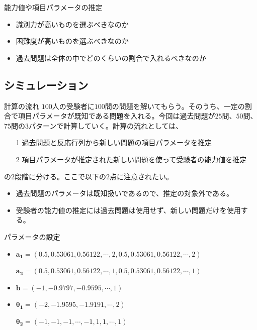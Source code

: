 \documentclass[aspectratio=169, dvipdfmx, 12pt]{beamer}
\begin{document}
\begin{frame}
  \begin{block}{能力値や項目パラメータの推定}
    \begin{itemize}
      \item 識別力が高いものを選ぶべきなのか
      \item 困難度が高いものを選ぶべきなのか
      \item 過去問題は全体の中でどのくらいの割合で入れるべきなのか
    \end{itemize}
  \end{block}
\end{frame}
\subsection{シミュレーション}
\begin{frame}
  \begin{block}{計算の流れ}
    $100$人の受験者に$100$問の問題を解いてもらう。そのうち、一定の割合で項目パラメータが既知である問題を入れる。今回は過去問題が$25$問、$50$問、$75$問の$3$パターンで計算していく。計算の流れとしては、
\begin{itemize}
  \item[1] 過去問題と反応行列から新しい問題の項目パラメータを推定
  \item[2] 項目パラメータが推定された新しい問題を使って受験者の能力値を推定
\end{itemize}
の$2$段階に分ける。ここで以下の$2$点に注意されたい。
\begin{itemize}
  \item 過去問題のパラメータは既知扱いであるので、推定の対象外である。
  \item 受験者の能力値の推定には過去問題は使用せず、新しい問題だけを使用する。
\end{itemize}
  \end{block}
\end{frame}
\begin{frame}
  \begin{block}{パラメータの設定}
    \begin{itemize}
      \item $\boldsymbol{a_1} = (0.5, 0.53061, 0.56122, \cdots, 2, 0.5, 0.53061, 0.56122, \cdots, 2)$
      \item[]
      \item[]
      $\boldsymbol{a_2} = (0.5, 0.53061, 0.56122, \cdots, 1, 0.5, 0.53061, 0.56122, \cdots, 1)$
      \item $\boldsymbol{b} = (-1, -0.9797, -0.9595, \cdots, 1)$
      \item $\boldsymbol{\theta_1} = (-2, -1.9595, -1.9191, \cdots, 2)$
      \item[]
      \item[]
      $\boldsymbol{\theta_2} = (-1, -1, -1, \cdots, -1, 1, 1, \cdots, 1)$
    \end{itemize}
  \end{block}
\end{frame}
\end{document}
